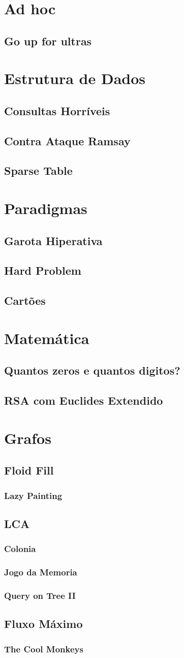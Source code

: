 \documentclass[a4paper,12pt]{article}
\newcommand\includes[4]{
   \subsection{#2}
   
}
\newcommand\includess[4]{
   \subsubsection{#2}
   
}
\begin{document}
\tableofcontents
\thispagestyle{fancy}
\newpage
\begin{multicols}{2}

\section{Ad hoc}
\includes{c++}{Go up for ultras}{adhoc}{ultra.cpp}

\section{Estrutura de Dados}
\includes{c++}{Consultas Horríveis}{ed}{horrivel.cpp}
\includes{c++}{Contra Ataque Ramsay}{ed}{contra_ataque_ramsay.cpp}
\includes{c++}{Sparse Table}{ed}{sparse_table.cpp}

\section{Paradigmas}
\includes{c++}{Garota Hiperativa}{paradigma}{hiper.cpp}
\includes{c++}{Hard Problem}{paradigma}{hard.cpp}
\includes{c++}{Cartões}{paradigma}{cartoes.cpp}

\section{Matemática}
\includes{c++}{Quantos zeros e quantos digitos?}{math}{zeros.cpp}
\includes{c++}{RSA com Euclides Extendido}{math}{rsaEuclides.cpp}


\section{Grafos}
\subsection{Floid Fill}
\includess{c++}{Lazy Painting}{graph}{lazypaint.cpp}
\subsection{LCA}
\includess{c++}{Colonia}{graph}{colonia_LCA.cpp}
\includess{c++}{Jogo da Memoria}{graph}{memoria.cpp}
\includess{c++}{Query on Tree II}{graph}{query.cpp}

\subsection{Fluxo Máximo}
\includess{c++}{The Cool Monkeys}{graph}{coolMonkeys.cpp}


\end{multicols}
\end{document}
